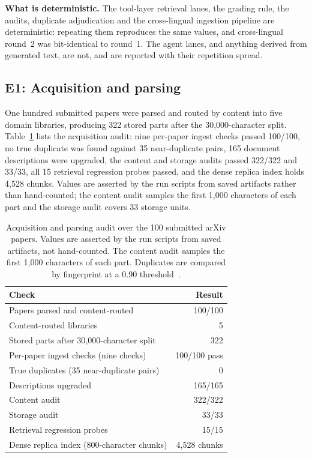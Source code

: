 \textbf{What is deterministic.} The tool-layer retrieval lanes, the grading rule, the audits, duplicate adjudication and the cross-lingual ingestion pipeline are deterministic: repeating them reproduces the same values, and cross-lingual round~2 was bit-identical to round~1. The agent lanes, and anything derived from generated text, are not, and are reported with their repetition spread.

\subsection{E1: Acquisition and parsing}
\label{sec:e1}

One hundred submitted papers were parsed and routed by content into five domain libraries, producing 322 stored parts after the 30{,}000-character split. Table~\ref{tab:acq-pipeline} lists the acquisition audit: nine per-paper ingest checks passed 100/100, no true duplicate was found against 35 near-duplicate pairs, 165 document descriptions were upgraded, the content and storage audits passed 322/322 and 33/33, all 15 retrieval regression probes passed, and the dense replica index holds 4{,}528 chunks. Values are asserted by the run scripts from saved artifacts rather than hand-counted; the content audit samples the first 1{,}000 characters of each part and the storage audit covers 33 storage units.

\begin{table}[t]
\centering
\small
\setlength{\tabcolsep}{4pt}
\caption{Acquisition and parsing audit over the 100 submitted arXiv papers.
Values are asserted by the run scripts from saved artifacts, not hand-counted.
The content audit samples the first 1{,}000 characters of each part. Duplicates
are compared by fingerprint at a 0.90 threshold~\cite{manku-near-dup-2007}.}
\label{tab:acq-pipeline}
\begin{tabular}{@{}lr@{}}
\toprule
Check & Result \\
\midrule
Papers parsed and content-routed & 100/100 \\
Content-routed libraries & 5 \\
Stored parts after 30{,}000-character split & 322 \\
Per-paper ingest checks (nine checks) & 100/100 pass \\
True duplicates (35 near-duplicate pairs) & 0 \\
Descriptions upgraded & 165/165 \\
Content audit & 322/322 \\
Storage audit & 33/33 \\
Retrieval regression probes & 15/15 \\
Dense replica index (800-character chunks) & 4{,}528 chunks \\
\bottomrule
\end{tabular}
\end{table}

